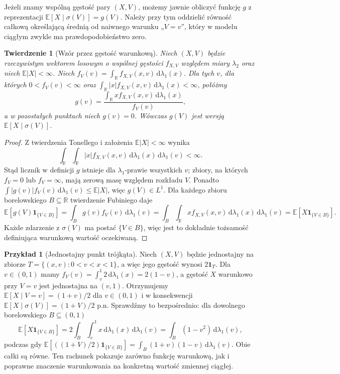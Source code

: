 \documentclass[11pt,a4paper,oneside]{report}
\numberwithin{equation}{chapter}
\theoremstyle{plain}
\newtheorem{twierdzenie}{Twierdzenie}[chapter]
\theoremstyle{definition}
\newtheorem{przyklad}{Przykład}[chapter]
\theoremstyle{remark}
\newcommand{\R}{\mathbb{R}}
\newcommand{\E}{\mathbb{E}}
\newcommand{\ind}[1]{\mathbf{1}_{#1}}
\newcommand{\dd}{\mathrm{d}}
\begin{document}
Jeżeli znamy wspólną gęstość pary $(X,V)$,
możemy jawnie obliczyć funkcję $g$ z reprezentacji
$\E[X\mid\sigma(V)]=g(V)$. Należy przy tym
oddzielić równość całkową określającą średnią
od naiwnego warunku „$V=v$”, który w modelu
ciągłym zwykle ma prawdopodobieństwo zero.

\begin{twierdzenie}[Wzór przez gęstość warunkową]
Niech $(X,V)$ będzie rzeczywistym wektorem losowym
o wspólnej gęstości $f_{X,V}$ względem miary
$\lambda_2$ oraz niech $\E|X|<\infty$.
Niech $f_V(v)=\int_\R f_{X,V}(x,v)\,\dd\lambda_1(x)$.
Dla tych $v$, dla których $0<f_V(v)<\infty$ oraz
$\int_\R |x|f_{X,V}(x,v)\,\dd\lambda_1(x)<\infty$,
połóżmy
\[
g(v)=\frac{\int_\R x f_{X,V}(x,v)\,\dd\lambda_1(x)}{f_V(v)},
\]
a w pozostałych punktach niech $g(v)=0$.
Wówczas $g(V)$ jest wersją
$\E[X\mid\sigma(V)]$.
\end{twierdzenie}
\begin{proof}
Z twierdzenia Tonellego i założenia $\E|X|<\infty$
wynika
\[
\int_\R\int_\R |x|f_{X,V}(x,v)
\,\dd\lambda_1(x)\,\dd\lambda_1(v)<\infty.
\]
Stąd licznik w definicji $g$ istnieje dla
$\lambda_1$-prawie wszystkich $v$; zbiory, na których
$f_V=0$ lub $f_V=\infty$, mają zerową masę
względem rozkładu $V$. Ponadto
$\int |g(v)|f_V(v)\,\dd\lambda_1(v)\leq\E|X|$,
więc $g(V)\in L^1$. Dla każdego zbioru borelowskiego
$B\subseteq\R$ twierdzenie Fubiniego daje
\[
\E[g(V)\ind{\{V\in B\}}]
=\int_Bg(v)f_V(v)\,\dd\lambda_1(v)
=\int_B\int_\R xf_{X,V}(x,v)
\,\dd\lambda_1(x)\,\dd\lambda_1(v)
=\E[X\ind{\{V\in B\}}].
\]
Każde zdarzenie z $\sigma(V)$ ma postać
$\{V\in B\}$, więc jest to dokładnie
tożsamość definiująca warunkową wartość oczekiwaną.
\end{proof}

\begin{przyklad}[Jednostajny punkt trójkąta]
Niech $(X,V)$ będzie jednostajny na zbiorze
$T=\{(x,v):0<v<x<1\}$, a więc jego gęstość
wynosi $2\ind T$. Dla $v\in(0,1)$ mamy
$f_V(v)=\int_v^1 2\,\dd\lambda_1(x)=2(1-v)$,
a gęstość $X$ warunkowo przy $V=v$ jest
jednostajna na $(v,1)$. Otrzymujemy
$\E[X\mid V=v]=(1+v)/2$ dla $v\in(0,1)$
i w konsekwencji
$\E[X\mid\sigma(V)]=(1+V)/2$ p.n.
Sprawdźmy to bezpośrednio: dla dowolnego
borelowskiego $B\subseteq(0,1)$
\[
\E[X\ind{\{V\in B\}}]
=2\int_B\!\int_v^1 x\,\dd\lambda_1(x)
\,\dd\lambda_1(v)
=\int_B(1-v^2)\,\dd\lambda_1(v),
\]
podczas gdy
$\E[((1+V)/2)\ind{\{V\in B\}}]
=\int_B (1+v)(1-v)\,\dd\lambda_1(v)$.
Obie całki są równe. Ten rachunek pokazuje
zarówno funkcję warunkową, jak i poprawne znaczenie
warunkowania na konkretną wartość zmiennej ciągłej.
\end{przyklad}
\end{document}
